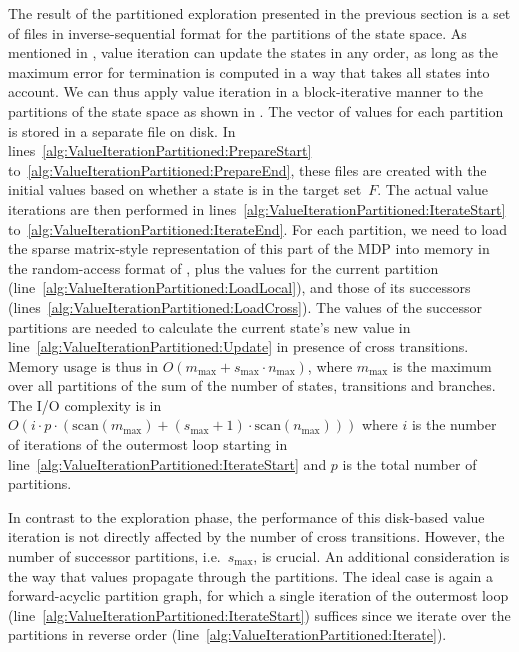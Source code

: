 \documentclass{llncs}
\newcommand{\ie}{i.e.\ }
\begin{document}
The result of the partitioned exploration presented in the previous section is a set of files in inverse-sequential format for the partitions of the state space.
As mentioned in , value iteration can update the states in any order, as long as the maximum error for termination is computed in a way that takes all states into account.
We can thus apply value iteration in a block-iterative manner to the partitions of the state space as shown in .
The vector of values for each partition is stored in a separate file on disk.
In lines~\ref{alg:ValueIterationPartitioned:PrepareStart} to~\ref{alg:ValueIterationPartitioned:PrepareEnd}, these files are created with the initial values based on whether a state is in the target set~$F$.
The actual value iterations are then performed in lines~\ref{alg:ValueIterationPartitioned:IterateStart} to~\ref{alg:ValueIterationPartitioned:IterateEnd}.
For each partition, we need to load the sparse matrix-style representation of this part of the MDP into memory in the random-access format of , plus the values for the current partition (line~\ref{alg:ValueIterationPartitioned:LoadLocal}), and those of its successors (lines~\ref{alg:ValueIterationPartitioned:LoadCross}).
The values of the successor partitions are needed to calculate the current state's new value in line~\ref{alg:ValueIterationPartitioned:Update} in presence of cross transitions.
Memory usage is thus in $O(m_{\max} + s_{\max} \cdot n_{\max})$, where $m_{\max}$ is the maximum over all partitions of the sum of the number of states, transitions and branches.
The I/O complexity is in $O(i \cdot p \cdot (\mathrm{scan}(m_{\max}) + (s_{\max} + 1) \cdot \mathrm{scan}(n_{\max})))$ where $i$ is the number of iterations of the outermost loop starting in line~\ref{alg:ValueIterationPartitioned:IterateStart} and $p$ is the total number of partitions.

In contrast to the exploration phase, the performance of this disk-based value iteration is not directly affected by the number of cross transitions.
However, the number of successor partitions, \ie $s_{\max}$, is crucial.
An additional consideration is the way that values propagate through the partitions.
The ideal case is again a forward-acyclic partition graph, for which
a single iteration of the outermost loop (line~\ref{alg:ValueIterationPartitioned:IterateStart}) suffices since we iterate over the partitions in reverse order (line~\ref{alg:ValueIterationPartitioned:Iterate}).
\end{document}
